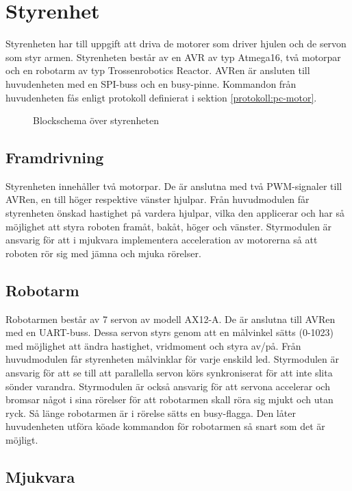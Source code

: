 \section{Styrenhet}
Styrenheten har till uppgift att driva de motorer som driver hjulen och de servon som styr armen. Styrenheten består av en AVR av typ Atmega16, två motorpar och en robotarm av typ Trossenrobotics Reactor. AVRen är ansluten till huvudenheten med en SPI-buss och en busy-pinne. Kommandon från huvudenheten fås enligt protokoll definierat i sektion \ref{protokoll:pc-motor}. 

\begin{figure}[h]
\center

\caption{Blockschema över styrenheten}
\end{figure}

\subsection{Framdrivning}

Styrenheten innehåller två motorpar. De är anslutna med två PWM-signaler till AVRen, en till höger respektive vänster hjulpar. Från huvudmodulen får styrenheten önskad hastighet på vardera hjulpar, vilka den applicerar och har så möjlighet att styra roboten framåt, bakåt, höger och vänster. Styrmodulen är ansvarig för att i mjukvara implementera acceleration av motorerna så att roboten rör sig med jämna och mjuka rörelser.

\subsection{Robotarm}

Robotarmen består av 7 servon av modell AX12-A. De är anslutna till AVRen med en UART-buss. Dessa servon styrs genom att en målvinkel sätts (0-1023) med möjlighet att ändra hastighet, vridmoment och styra av/på. Från huvudmodulen får styrenheten målvinklar för varje enskild led. Styrmodulen är ansvarig för att se till att parallella servon körs synkroniserat för att inte slita sönder varandra. Styrmodulen är också ansvarig för att servona accelerar och bromsar något i sina rörelser för att robotarmen skall röra sig mjukt och utan ryck. Så länge robotarmen är i rörelse sätts en busy-flagga. Den låter huvudenheten utföra köade kommandon för robotarmen så snart som det är möjligt. 

\subsection{Mjukvara}

